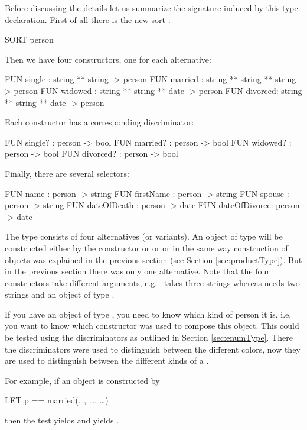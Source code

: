 Before discussing the details let us summarize the signature induced
by this  type declaration.
First of all there is the new sort :
\begin{prog}
        SORT person
\end{prog}
Then we have four constructors, one for each alternative:
\begin{prog}
        FUN single  : string ** string -> person
        FUN married : string ** string ** string -> person
        FUN widowed : string ** string ** date -> person
        FUN divorced: string ** string ** date -> person
\end{prog}

Each constructor has a corresponding discriminator:
\begin{prog}
        FUN single?  : person -> bool
        FUN married? : person -> bool 
        FUN widowed? : person -> bool 
        FUN divorced? : person -> bool 
\end{prog}
 Finally, there are several selectors:
\begin{prog}
        FUN name       : person -> string
        FUN firstName  : person -> string
        FUN spouse     : person -> string
        FUN dateOfDeath  : person -> date
        FUN dateOfDivorce: person -> date
\end{prog}

\bigskip
The  type consists of four alternatives (or variants).
An object of type  will be constructed either by the
constructor  or  or  or
\/  in the same way construction of objects was
explained in the previous section 
(see Section \ref{sec:productType}). 
But in the previous section there was only one alternative.
Note that the four constructors take different arguments, e.g.\
 takes three strings whereas  needs two strings
and an object of type \pro{date}.

If you have an object of type , you need to know which kind of
person it is, i.e.~ you want to know which constructor was used to compose
this object.
This could be tested using the discriminators  as outlined in Section
\ref{sec:enumType}. 
There the discriminators were used to distinguish between the
different colors, now they are used to distinguish between the different
kinds of a \pro{person}.

 For example, if an object  is constructed by 
\begin{prog}
        LET p == married(\dots, \dots, \dots)
\end{prog}
then the test  yields  and 
yields \pro{false}.
\medskip

